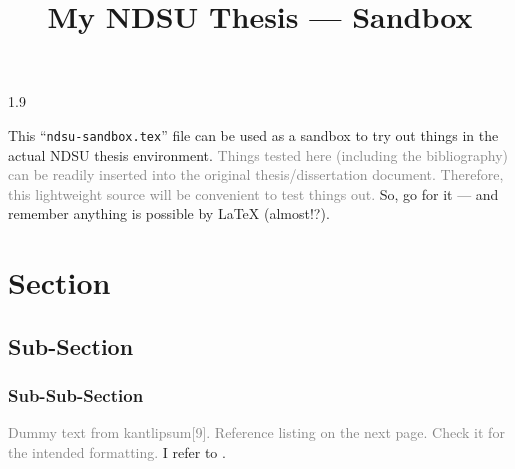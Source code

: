 \documentclass[12pt,mathdesign]{ndsu-thesis-2022}
\title{My NDSU Thesis --- Sandbox}
\newcommand{\makebib}{\biblio{apalike}{mybib}} %
\newcommand\myspacing{1.9} %
\begin{document}
\begin{spacing}{\myspacing}      %


This ``\texttt{ndsu-sandbox.tex}'' file can be used as a sandbox to try out things in the actual NDSU thesis environment. \textcolor{gray}{Things tested here (including the bibliography) can be readily inserted into the original thesis/dissertation document. Therefore, this lightweight source will be convenient to test things out.} So, go for it --- and remember anything is possible by \LaTeX{} (almost!?).

\section{Section}
\subsection{Sub-Section}
\subsubsection{Sub-Sub-Section}

\textcolor{gray}{Dummy text from kantlipsum[9]. Reference listing on the next page. Check it for the intended formatting.} I refer to \citep{lamport94,kopka2004guide,baczkowski1990ndsu}. \kant[9]

\makebib


\end{spacing}
\end{document}
